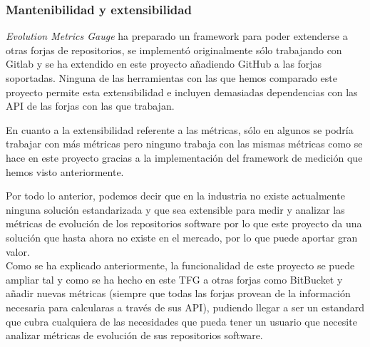 \newpage
\subsubsection{Mantenibilidad y extensibilidad}

\textit{Evolution Metrics Gauge} ha preparado un framework para poder extenderse a otras forjas de repositorios, se implementó originalmente sólo trabajando con Gitlab y se ha extendido en este proyecto añadiendo GitHub a las forjas soportadas. Ninguna de las herramientas con las que hemos comparado este proyecto permite esta extensibilidad e incluyen demasiadas dependencias con las API de las forjas con las que trabajan.

En cuanto a la extensibilidad referente a las métricas, sólo en algunos se podría trabajar con más métricas pero ninguno trabaja con las mismas métricas como se hace en este proyecto gracias a la implementación del framework de medición que hemos visto anteriormente.

Por todo lo anterior, podemos decir que en la industria no existe actualmente ninguna solución estandarizada y que sea extensible para medir y analizar las métricas de evolución de los repositorios software por lo que este proyecto da una solución que hasta ahora no existe en el mercado, por lo que puede aportar gran valor.\\

Como se ha explicado anteriormente, la funcionalidad de este proyecto se puede ampliar tal y como se ha hecho en este TFG a otras forjas como BitBucket y añadir nuevas métricas (siempre que todas las forjas provean de la información necesaria para calcularas a través de sus API), pudiendo llegar a ser un estandard que cubra cualquiera de las necesidades que pueda tener un usuario que necesite analizar métricas de evolución de sus repositorios software.

\newpage
